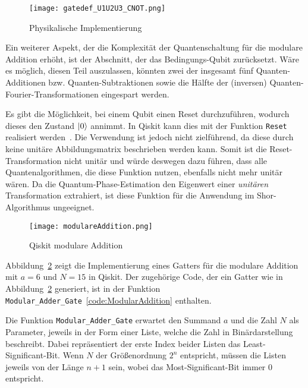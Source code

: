 \begin{figure}[H]
  \centering
  \texttt{[image: gatedef\_U1U2U3\_CNOT.png]}
  \caption{Physikalische Implementierung~\cite{ibmqx5}}
  \label{fig:gatedef_U1U2U3_CNOT}
\end{figure}

Ein weiterer Aspekt, 
der die Komplexität der Quantenschaltung für die modulare Addition erhöht, 
ist der Abschnitt, der das Bedingungs-Qubit zurücksetzt.
Wäre es möglich, diesen Teil auszulassen, könnten zwei der insgesamt fünf Quanten-Additionen bzw. 
Quanten-Subtraktionen sowie die Hälfte der (inversen) Quanten-Fourier-Transformationen eingespart werden.

Es gibt die Möglichkeit, bei einem Qubit einen Reset durchzuführen, wodurch dieses den Zustand \(\ket{0}\) annimmt.
In Qiskit kann dies mit der Funktion \texttt{Reset} realisiert werden~\cite{qiskitReset}.
Die Verwendung ist jedoch nicht zielführend, da diese durch keine unitäre Abbildungsmatrix
beschrieben werden kann.
Somit ist die Reset-Transformation nicht unitär und würde deswegen dazu führen, dass alle Quantenalgorithmen, 
die diese Funktion nutzen, ebenfalls nicht mehr unitär wären.
Da die Quantum-Phase-Estimation den Eigenwert einer \emph{unitären} Transformation extrahiert, 
ist diese Funktion für die Anwendung im Shor-Algorithmus ungeeignet.

\begin{figure}[H]
  \centering
  \texttt{[image: modulareAddition.png]}
  \caption{Qiskit modulare Addition}
  \label{fig:ModularAddition}
\end{figure}

Abbildung~\ref{fig:ModularAddition} zeigt die Implementierung eines Gatters für die modulare Addition 
mit \(a = 6\) und \(N = 15\) in Qiskit.
Der zugehörige Code, der ein Gatter wie in Abbildung~\ref{fig:ModularAddition} generiert, 
ist in der Funktion \texttt{Modular_Adder_Gate}~\ref{code:ModularAddition} enthalten.

Die Funktion \texttt{Modular_Adder_Gate} erwartet den Summand \(a\) und die Zahl \(N\) als Parameter, 
jeweils in der Form einer Liste, 
welche die Zahl in Binärdarstellung beschreibt.
Dabei repräsentiert der erste Index beider Listen das Least-Significant-Bit.
Wenn \(N\) der Größenordnung \(2^n\) entspricht, 
müssen die Listen jeweils von der Länge \(n+1\) sein, 
wobei das Most-Significant-Bit immer \(0\) entspricht.

